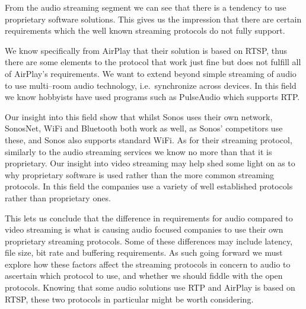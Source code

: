 \bigskip
From the audio streaming segment we can see that there is a tendency to use proprietary software solutions.
This gives us the impression that there are certain requirements which the well known streaming protocols do not fully support.

We know specifically from AirPlay that their solution is based on \ac{RTSP}, thus there are some elements to the protocol that work just fine but does not fulfill all of AirPlay's requirements.
We want to extend beyond simple streaming of audio to use multi--room audio technology, i.e.~synchronize across devices.
In this field we know hobbyists have used programs such as PulseAudio which supports \ac{RTP}.

Our insight into this field show that whilst Sonos uses their own network, SonosNet, WiFi and Bluetooth both work as well, as Sonos' competitors use these, and Sonos also supports standard WiFi.
As for their streaming protocol, similarly to the audio streaming services we know no more than that it is proprietary.
Our insight into video streaming may help shed some light on as to why proprietary software is used rather than the more common streaming protocols.
In this field the companies use a variety of well established protocols rather than proprietary ones.

This lets us conclude that the difference in requirements for audio compared to video streaming is what is causing audio focused companies to use their own proprietary streaming protocols.
Some of these differences may include latency, file size, bit rate and buffering requirements.
As such going forward we must explore how these factors affect the streaming protocols in concern to audio to ascertain which protocol to use, and whether we should fiddle with the open protocols.
Knowing that some audio solutions use \ac{RTP} and AirPlay is based on \ac{RTSP}, these two protocols in particular might be worth considering.



